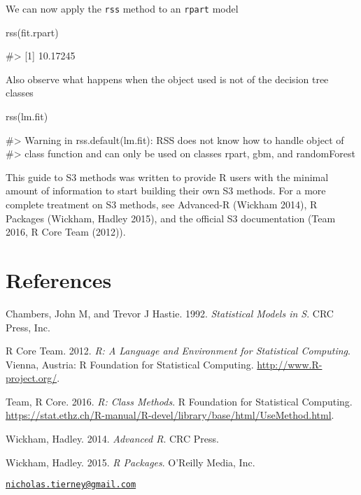 We can now apply the \texttt{rss} method to an \texttt{rpart} model

\begin{Schunk}
\begin{Sinput}
rss(fit.rpart)
\end{Sinput}
\begin{Soutput}
#> [1] 10.17245
\end{Soutput}
\end{Schunk}

Also observe what happens when the object used is not of the decision
tree classes

\begin{Schunk}
\begin{Sinput}
rss(lm.fit)
\end{Sinput}
\begin{Soutput}
#> Warning in rss.default(lm.fit): RSS does not know how to handle object of
#> class function and can only be used on classes rpart, gbm, and randomForest
\end{Soutput}
\end{Schunk}

This guide to S3 methods was written to provide R users with the minimal
amount of information to start building their own S3 methods. For a more
complete treatment on S3 methods, see Advanced-R (Wickham 2014), R
Packages (Wickham, Hadley 2015), and the official S3 documentation (Team
2016, R Core Team (2012)).

\section*{References}\label{references}

\hypertarget{refs}{}
\hypertarget{ref-chambers1992}{}
Chambers, John M, and Trevor J Hastie. 1992. \emph{Statistical Models in
S}. CRC Press, Inc.

\hypertarget{ref-R}{}
R Core Team. 2012. \emph{R: A Language and Environment for Statistical
Computing}. Vienna, Austria: R Foundation for Statistical Computing.
\url{http://www.R-project.org/}.

\hypertarget{ref-rclassmethods}{}
Team, R Core. 2016. \emph{R: Class Methods}. R Foundation for
Statistical Computing.
\url{https://stat.ethz.ch/R-manual/R-devel/library/base/html/UseMethod.html}.

\hypertarget{ref-wickham2014}{}
Wickham, Hadley. 2014. \emph{Advanced R}. CRC Press.

\hypertarget{ref-wickham2015}{}
Wickham, Hadley. 2015. \emph{R Packages}. O'Reilly Media, Inc.

\address{%
Nicholas Tierney\\
Queensland University of Technology\\
Level 8, Y Block, Main Drive, QUT, Brisbane, Australia\\
}
\href{mailto:nicholas.tierney@gmail.com}{\nolinkurl{nicholas.tierney@gmail.com}}

